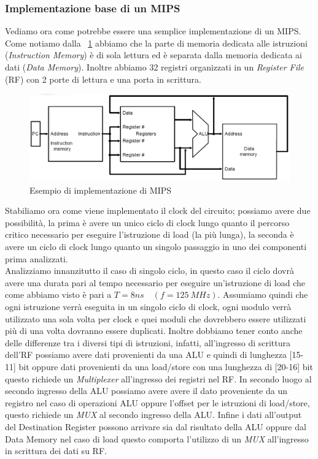 \subsubsection{Implementazione base di un MIPS}
Vediamo ora come potrebbe essere una semplice implementazione di un MIPS. Come notiamo dalla \figurename~\ref{fig:mips} abbiamo che la parte di memoria dedicata alle istruzioni (\emph{Instruction Memory}) è di sola lettura ed è separata dalla memoria dedicata ai dati (\emph{Data Memory}). Inoltre abbiamo 32 registri organizzati in un \emph{Register File} (RF) con 2 porte di lettura e una porta in scrittura.
\begin{figure}[htb]
\centering
\includegraphics[scale=0.48]{img/mips.png}
\caption{Esempio di implementazione di MIPS}\label{fig:mips}
\end{figure}
Stabiliamo ora come viene implementato il clock del circuito; possiamo avere due possibilità, la prima è avere un unico ciclo di clock lungo quanto il percorso critico necessario per eseguire l'istruzione di load (la più lunga), la seconda è avere un ciclo di clock lungo quanto un singolo passaggio in uno dei componenti prima analizzati.\\
Analizziamo innanzitutto il caso di singolo ciclo, in questo caso il ciclo dovrà avere una durata pari al tempo necessario per eseguire un'istruzione di load che come abbiamo visto è pari a $T = 8 ns \quad (f=125 \ MHz)$. Assumiamo quindi che ogni istruzione verrà eseguita in un singolo ciclo di clock, ogni modulo verrà utilizzato una sola volta per clock e quei moduli che dovrebbero essere utilizzati più di una volta dovranno essere duplicati.
Inoltre dobbiamo tener conto anche delle differenze tra i diversi tipi di istruzioni, infatti, all'ingresso di scrittura dell'RF possiamo avere dati provenienti da una ALU e quindi di lunghezza [15-11] bit oppure dati provenienti da una load/store con una lunghezza di [20-16] bit questo richiede un \emph{Multiplexer} all'ingresso dei registri nel RF. In secondo luogo al secondo ingresso della ALU possiamo avere avere il dato proveniente da un registro nel caso di operazioni ALU oppure l'offset per le istruzioni di load/store, questo richiede un \emph{MUX} al secondo ingresso della ALU. Infine i dati all'output del Destination Register possono arrivare sia dal risultato della ALU oppure dal Data Memory nel caso di load questo comporta l'utilizzo di un \emph{MUX} all'ingresso in scrittura dei dati su RF.
